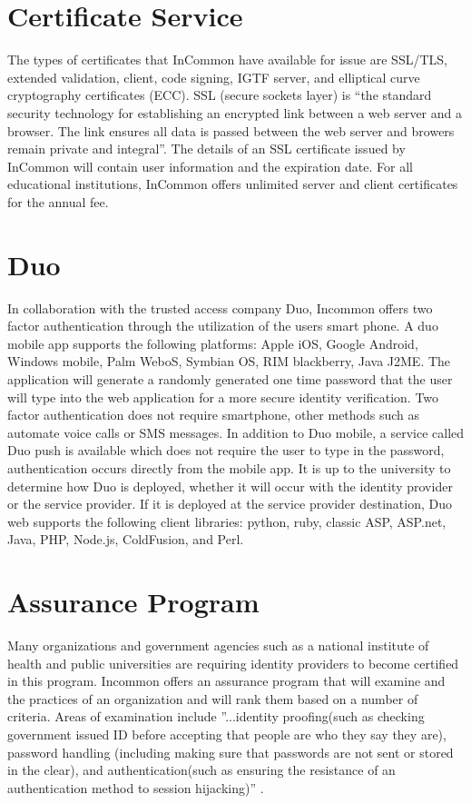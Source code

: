 \documentclass[9pt,twocolumn,twoside]{../../styles/osajnl}
\begin{document}
\section{Certificate Service}

The types of certificates that InCommon have available for issue are
SSL/TLS, extended validation, client, code signing, IGTF server, and
elliptical curve cryptography certificates (ECC).  SSL (secure sockets
layer) is “the standard security technology for establishing an
encrypted link between a web server and a browser.  The link ensures
all data is passed between the web server and browers remain private
and integral”\cite{www-ssl}.  The details of an SSL certificate
issued by InCommon will contain user information and the
expiration date. For all educational institutions, InCommon offers
unlimited server and client certificates for the annual fee.

\section{Duo}

In collaboration with the trusted access company Duo, Incommon offers
two factor authentication through the utilization of the users smart
phone\cite{www-duo}.  A duo mobile app supports the following
platforms: Apple iOS, Google Android, Windows mobile, Palm WeboS,
Symbian OS, RIM blackberry, Java J2ME.  The application will generate
a randomly generated one time password that the user will type into
the web application for a more secure identity verification.  Two
factor authentication does not require smartphone, other methods such
as automate voice calls or SMS messages.  In addition to Duo mobile, a
service called Duo push is available which does not require the user
to type in the password, authentication occurs directly from the
mobile app.  It is up to the university to determine how Duo is
deployed, whether it will occur with the identity provider or the
service provider.  If it is deployed at the service provider
destination, Duo web supports the following client libraries: python,
ruby, classic ASP, ASP.net, Java, PHP, Node.js, ColdFusion, and Perl.

\section{Assurance Program}

Many organizations and government agencies such as a national
institute of health and public universities are requiring identity
providers to become certified in this program.  Incommon offers an
assurance program that will examine and the practices of an
organization and will rank them based on a number of criteria.  Areas
of examination include ''...identity proofing(such as checking
government issued ID before accepting that people are who they say
they are), password handling (including making sure that passwords are
not sent or stored in the clear), and authentication(such as ensuring
the resistance of an authentication method to session hijacking)''
\cite{www-harvard}.
\end{document}
